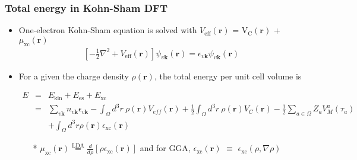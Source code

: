 \documentclass[10pt, handout]{beamer}
\newcommand{\br}{\bm{r}}
\newcommand{\bk}{\bm{k}}
\newcommand{\nologo}{\setbeamertemplate{logo}{}}  %
\begin{document}
{\nologo
\begin{frame}
	\frametitle{Total energy in Kohn-Sham DFT}
\small{	
	\begin{itemize}
		\item One-electron Kohn-Sham equation is solved with $V_{\text{eff}}(\br)$ = V$_\text{C}(\br)$ + $\mu_{\text{xc}}(\br)$ %
		\begin{eqnarray}\nonumber
			[-\frac{1}{2}\nabla^2+V_{\text{eff}}(\br) ]\psi_{\upsilon\bk}(\br) = \epsilon_{\upsilon\bk} \psi_{\upsilon\bk}(\br)
		\end{eqnarray}
		\item For a given the charge density $\rho(\br)$, the total energy per unit cell volume is
				
			\begin{eqnarray}\nonumber
				E &=& E_{\text{kin}} + E_{\text{es}} + E_{\text{xc}}  \\ \nonumber
				&=& \sum_{v\textbf{k}}n_{v\textbf{k}}\epsilon_{v\textbf{k}}-\int_{\Omega}d^3r~\rho(\br)V_{eff}(\br) +
				\frac{1}{2}\int_{\Omega}d^3r~\rho(\br)V_{C}(\br)-\frac{1}{2}\sum_{a\in\Omega}Z_aV_M^a(\tau_a) \\&&\nonumber +
				\int_{\Omega}d^3r\rho(\br)\epsilon_{\text{xc}}(\br)
			\end{eqnarray}
		    \begin{enumerate}
		    	\item[*] $\mu_{\text{xc}}(\br)\stackrel{\text{LDA}}{=}\frac{d}{d\rho}[\rho \epsilon_{\text{xc}}(\br)]$ and for GGA, $\epsilon_{\text{xc}}(\br)$ $\equiv$ $\epsilon_{\text{xc}}(\rho,\nabla \rho)$
		    \end{enumerate}
	\end{itemize}	
	
}	
\end{frame}
}
\end{document}

